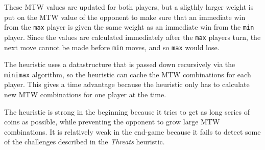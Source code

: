 \documentclass[a4paper, titlepage]{article}
\begin{document}
These MTW values are updated for both players, but a sligthly larger weight is put on the 
MTW value of the opponent to make sure that an immediate win from the \texttt{max} player 
is given the same weight as an immediate win from the \texttt{min} player. Since the values 
are calculated immediately after the \texttt{max} players turn, the next move cannot be 
made before \texttt{min} moves, and so \texttt{max} would lose.

The heuristic uses a datastructure that is passed down recursively via the 
\texttt{minimax} algorithm, so the heuristic can cache the MTW combinations for each player.
This gives a time advantage because the heuristic only has to calculate new MTW 
combinations for one player at the time.

The heuristic is strong in the beginning because it tries to get as long series of coins
as possible, while preventing the opponent to grow large MTW combinations. It is 
relatively weak in the end-game because it fails to detect some of the challenges 
described in the \textit{Threats} heuristic.
\end{document}
